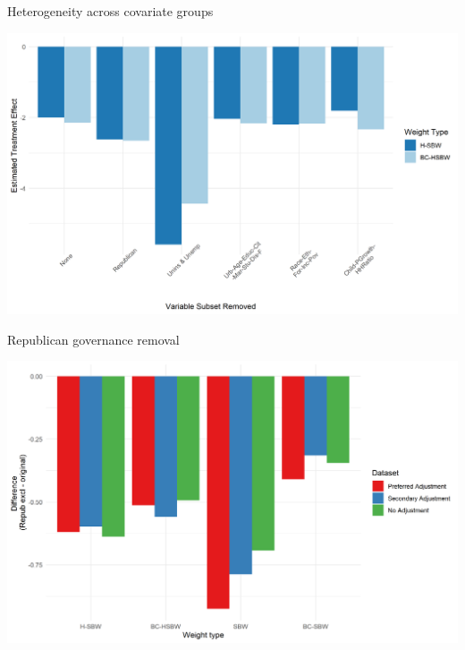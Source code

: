 \documentclass[hyperref={pdfpagelabels=false}]{beamer}
\begin{document}
\begin{frame}{Heterogeneity across covariate groups}
\begin{center}
	\includegraphics[scale=0.5]{01_Plots/loo-covariates-main-c1.png}
\end{center}
\end{frame}

\begin{frame}{Republican governance removal}
\begin{center}
	\includegraphics[scale=0.5]{01_Plots/repub-diff-c1-robustness.png}
\end{center}
\end{frame}
\end{document}
